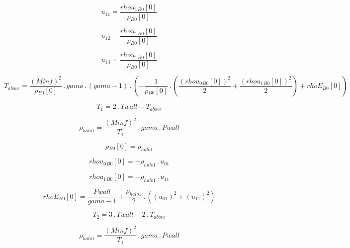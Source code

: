 \documentclass{article}
\begin{document}
\begin{dmath}u_{11} = \frac{{rhou_{1}{_{B0}}}[{0}]}{{\rho{_{B0}}}[{0}]}\end{dmath}

\begin{dmath}u_{12} = \frac{{rhou_{1}{_{B0}}}[{0}]}{{\rho{_{B0}}}[{0}]}\end{dmath}

\begin{dmath}u_{13} = \frac{{rhou_{1}{_{B0}}}[{0}]}{{\rho{_{B0}}}[{0}]}\end{dmath}

\begin{dmath}T_{above} = \frac{\left(Minf \right)^{2}}{{\rho{_{B0}}}[{0}]} \,.\, gama \,.\, \left(gama - 1\right) \,.\, \left(- \frac{1}{{\rho{_{B0}}}[{0}]} \,.\, \left(\frac{\left({rhou_{0}{_{B0}}}[{0}] \right)^{2}}{2} + 
\frac{\left({rhou_{1}{_{B0}}}[{0}] \right)^{2}}{2}\right) + {rhoE{_{B0}}}[{0}]\right)\end{dmath}

\begin{dmath}T_{1} = 2 \,.\, Twall - T_{above}\end{dmath}

\begin{dmath}\rho_{halo 1} = \frac{\left(Minf \right)^{2}}{T_{1}} \,.\, gama \,.\, Pwall\end{dmath}

\begin{dmath}{\rho{_{B0}}}[{0}] = \rho_{halo 1}\end{dmath}

\begin{dmath}{rhou_{0}{_{B0}}}[{0}] = - \rho_{halo 1} \,.\, u_{01}\end{dmath}

\begin{dmath}{rhou_{1}{_{B0}}}[{0}] = - \rho_{halo 1} \,.\, u_{11}\end{dmath}

\begin{dmath}{rhoE{_{B0}}}[{0}] = \frac{Pwall}{gama - 1} + \frac{\rho_{halo 1}}{2} \,.\, \left(\left(u_{01} \right)^{2} + \left(u_{11} \right)^{2}\right)\end{dmath}

\begin{dmath}T_{2} = 3 \,.\, Twall - 2 \,.\, T_{above}\end{dmath}

\begin{dmath}\rho_{halo 1} = \frac{\left(Minf \right)^{2}}{T_{1}} \,.\, gama \,.\, Pwall\end{dmath}
\end{document}
